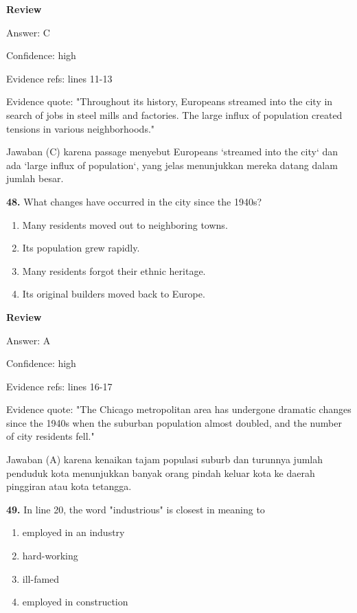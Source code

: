 \documentclass[12pt]{article}
\begin{document}
\par
\begingroup
\setlength{\parskip}{0pt}
\setlength{\parindent}{0pt}
\textbf{Review}\par
Answer: C\par
Confidence: high\par
Evidence refs: lines 11-13\par
Evidence quote: "Throughout its history, Europeans streamed into the city in search of jobs in steel mills and factories. The large influx of population created tensions in various neighborhoods."\par
Jawaban (C) karena passage menyebut Europeans `streamed into the city` dan ada `large influx of population`, yang jelas menunjukkan mereka datang dalam jumlah besar.\par
\endgroup
\par
\vspace{0.25\baselineskip}
\noindent\textbf{48.} What changes have occurred in the city since the 1940s?
\begin{enumerate}[label=(\Alph*),leftmargin=*,itemsep=0.2em]
\item Many residents moved out to neighboring towns.
\item Its population grew rapidly.
\item Many residents forgot their ethnic heritage.
\item Its original builders moved back to Europe.
\end{enumerate}
\par
\begingroup
\setlength{\parskip}{0pt}
\setlength{\parindent}{0pt}
\textbf{Review}\par
Answer: A\par
Confidence: high\par
Evidence refs: lines 16-17\par
Evidence quote: "The Chicago metropolitan area has undergone dramatic changes since the 1940s when the suburban population almost doubled, and the number of city residents fell."\par
Jawaban (A) karena kenaikan tajam populasi suburb dan turunnya jumlah penduduk kota menunjukkan banyak orang pindah keluar kota ke daerah pinggiran atau kota tetangga.\par
\endgroup
\par
\vspace{0.25\baselineskip}
\noindent\textbf{49.} In line 20, the word "industrious" is closest in meaning to
\begin{enumerate}[label=(\Alph*),leftmargin=*,itemsep=0.2em]
\item employed in an industry
\item hard-working
\item ill-famed
\item employed in construction
\end{enumerate}
\end{document}
